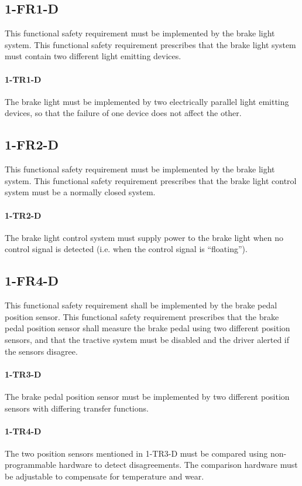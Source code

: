 \subsection{1-FR1-D}
This functional safety requirement must be implemented by the brake light system.
This functional safety requirement prescribes that the brake light system must contain two different light emitting devices.

\paragraph{1-TR1-D}
The brake light must be implemented by two electrically parallel light emitting devices, so that the failure of one device does not affect the other.

\subsection{1-FR2-D}
This functional safety requirement must be implemented by the brake light system.
This functional safety requirement prescribes that the brake light control system must be a normally closed system.

\paragraph{1-TR2-D}
The brake light control system must supply power to the brake light when no control signal is detected (i.e. when the control signal is ``floating'').

\subsection{1-FR4-D}
This functional safety requirement shall be implemented by the brake pedal position sensor.
This functional safety requirement prescribes that the brake pedal position sensor shall measure the  brake pedal using two different position sensors, and that the tractive system must be disabled and the driver alerted if the sensors disagree.

\paragraph{1-TR3-D}
The brake pedal position sensor must be implemented by two different position sensors with differing transfer functions.

\paragraph{1-TR4-D}
The two position sensors mentioned in 1-TR3-D must be compared using non-programmable hardware to detect disagreements.
The comparison hardware must be adjustable to compensate for temperature and wear.

